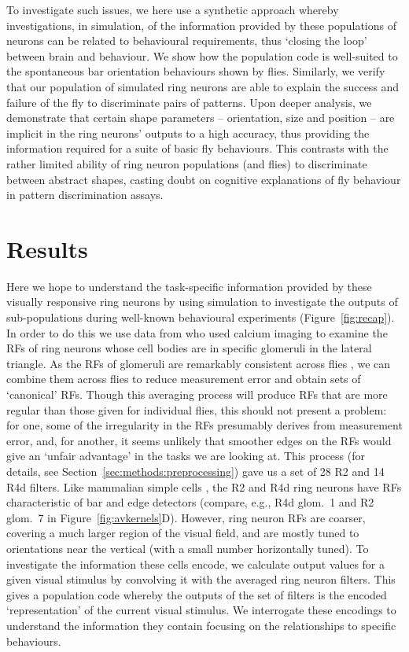 \documentclass[10pt]{article}
\begin{document}
To investigate such issues, we here use a synthetic approach whereby investigations, in simulation, of the information provided by these populations of neurons can be related to behavioural requirements, thus `closing the loop' between brain and behaviour. We show how the population code is well-suited to the spontaneous bar orientation behaviours shown by flies. Similarly, we verify that our population of simulated ring neurons are able to explain the success and failure of the fly to discriminate pairs of patterns. Upon deeper analysis, we demonstrate that certain shape parameters -- orientation, size and position -- are implicit in the ring neurons' outputs to a high accuracy, thus providing the information required for a suite of basic fly behaviours. This contrasts with the rather limited ability of ring neuron populations (and flies) to discriminate between abstract shapes, casting doubt on cognitive explanations of fly behaviour in pattern discrimination assays.

\section*{Results}
Here we hope to understand the task-specific information provided by these visually responsive ring neurons by using simulation to investigate the outputs of sub-populations during well-known behavioural experiments (Figure~\ref{fig:recap}). In order to do this we use data from \cite{Seelig2013} who used calcium imaging to examine the \acp{RF} of ring neurons whose cell bodies are in specific glomeruli in the lateral triangle. As the RFs of glomeruli are remarkably consistent across flies \cite{Seelig2013}, we can combine them across flies to reduce measurement error and obtain sets of `canonical' RFs. Though this averaging process will produce \acp{RF} that are more regular than those given for individual flies, this should not present a problem: for one, some of the irregularity in the \acp{RF} presumably derives from measurement error, and, for another, it seems unlikely that smoother edges on the \acp{RF} would give an `unfair advantage' in the tasks we are looking at. This process (for details, see Section~\ref{sec:methods:preprocessing}) gave us a set of 28 R2 and 14 R4d filters. Like mammalian simple cells \cite{Hubel1962,Wystrach2014}, the R2 and R4d ring neurons have RFs characteristic of bar and edge detectors (compare, e.g., R4d glom.~1 and R2 glom.~7 in Figure~\ref{fig:avkernels}D).
However, ring neuron RFs are coarser, covering a much larger region of the visual field, and are mostly tuned to orientations near the vertical (with a small number horizontally tuned). To investigate the information these cells encode, we calculate output values for a given visual stimulus by convolving it with the averaged ring neuron filters. This gives a population code whereby the outputs of the set of filters is the encoded `representation' of the current visual stimulus. We interrogate these encodings to understand the information they contain focusing on the relationships to specific behaviours.
\end{document}
